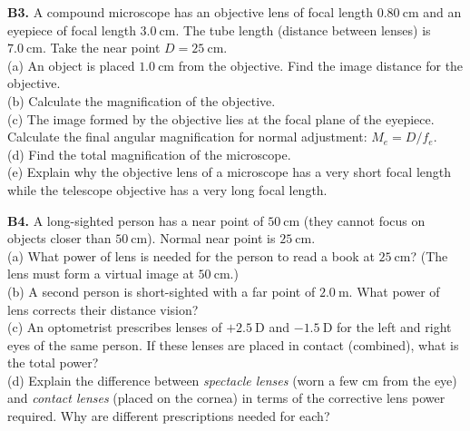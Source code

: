 \begin{exercisebox}[20]
\vspace{0.4cm}

\textbf{B3.} A compound microscope has an objective
lens of focal length $0.80\ \text{cm}$ and an
eyepiece of focal length $3.0\ \text{cm}$.
The tube length (distance between lenses) is
$7.0\ \text{cm}$. Take the near point $D = 25\ \text{cm}$.\\[4pt]
(a) An object is placed $1.0\ \text{cm}$ from the
objective. Find the image distance for the objective.\\
(b) Calculate the magnification of the objective.\\
(c) The image formed by the objective lies at the
focal plane of the eyepiece. Calculate the final
angular magnification for normal adjustment:
$M_e = D/f_e$.\\
(d) Find the total magnification of the microscope.\\
(e) Explain why the objective lens of a microscope
has a very short focal length while the telescope
objective has a very long focal length.
\hfill{}

\vspace{0.4cm}

\textbf{B4.} A long-sighted person has a near point
of $50\ \text{cm}$ (they cannot focus on objects
closer than $50\ \text{cm}$). Normal near point is
$25\ \text{cm}$.\\[4pt]
(a) What power of lens is needed for the person to
read a book at $25\ \text{cm}$? (The lens must form
a virtual image at $50\ \text{cm}$.)\\
(b) A second person is short-sighted with a far point
of $2.0\ \text{m}$. What power of lens corrects
their distance vision?\\
(c) An optometrist prescribes lenses of $+2.5\ \text{D}$
and $-1.5\ \text{D}$ for the left and right eyes
of the same person. If these lenses are placed in
contact (combined), what is the total power?\\
(d) Explain the difference between \textit{spectacle
lenses} (worn a few cm from the eye) and
\textit{contact lenses} (placed on the cornea) in
terms of the corrective lens power required. Why
are different prescriptions needed for each?
\hfill{}

\vspace{0.4cm}


\end{exercisebox}
